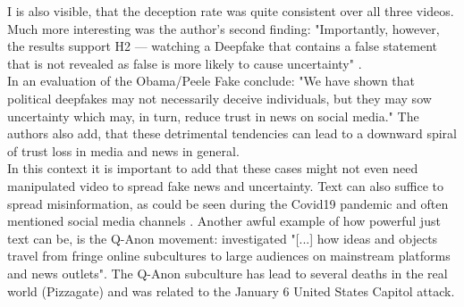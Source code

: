 \documentclass[
  a4paper,  %
  twoside,  %
  bibliography=totoc,
  headsepline,
  cleardoublepage=empty,
  parskip=half,
  draft=false
]{scrbook}
\begin{document}
I is also visible, that the deception rate was quite consistent over all three videos. Much more interesting was the author's second finding: "Importantly, however, the results support H2 — watching a Deepfake that contains a false statement that is not revealed as false is more likely to cause uncertainty" \cite{vaccariDeepfakesDisinformationExploring2020}. \\
In an evaluation of the Obama/Peele Fake \citet{vaccariDeepfakesDisinformationExploring2020} conclude: "We have shown that political deepfakes may not necessarily deceive individuals, but they may sow uncertainty which may, in turn, reduce trust in news on social media." The authors also add, that these detrimental tendencies can lead to a downward spiral of trust loss in media and news in general. \\
In this context it is important to add that these cases might not even need manipulated video to spread fake news and uncertainty. Text can also suffice to spread misinformation, as could be seen during the Covid19 pandemic and often mentioned social media channels \cite{naeemExplorationHowFake2021}. Another awful example of how powerful just text can be, is the Q-Anon movement: \cite{zeeuwTracingNormieficationCrossplatform2020} investigated "[...] how ideas and objects travel from fringe online subcultures to large audiences on mainstream platforms and news outlets". The Q-Anon subculture has lead to several deaths in the real world (Pizzagate) and was related to the January 6 United States Capitol attack.
\end{document}
